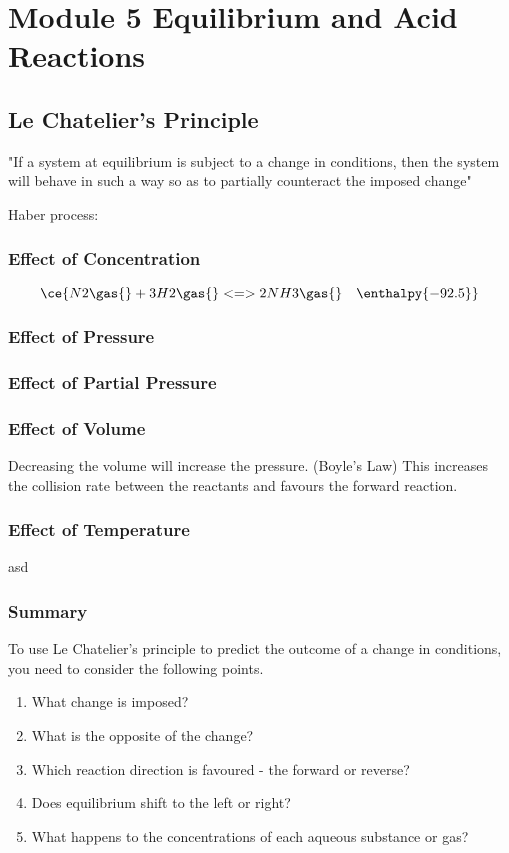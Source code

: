 
\chapter{Module 5 \; Equilibrium and Acid Reactions}

\section{Le Chatelier's Principle} \label{29/10/2024-31/10/2024}
	"If a system at equilibrium is subject to a change in conditions, then the system will behave in such a way so as to partially counteract the imposed change"

	Haber process:

	\subsection{Effect of Concentration}
		\begin{equation}
			\ce{N2\gas{} + 3H2\gas{} <=> 2NH3\gas{} \quad \enthalpy{-92.5}}
		\end{equation}
		

	\subsection{Effect of Pressure}
	\subsection{Effect of Partial Pressure}
	\subsection{Effect of Volume}
		Decreasing the volume will increase the pressure. (Boyle's Law) This increases the collision rate between the reactants and favours the forward reaction.

	\subsection{Effect of Temperature}
		asd
	
	\subsection{Summary}
		To use Le Chatelier's principle to predict the outcome of a change in conditions, you need to consider the following points.
		\begin{enumerate}
			\item What change is imposed?
			\item What is the opposite of the change?
			\item Which reaction direction is favoured - the forward or reverse?
			\item Does equilibrium shift to the left or right?
			\item What happens to the concentrations of each aqueous substance or gas?
		\end{enumerate}

